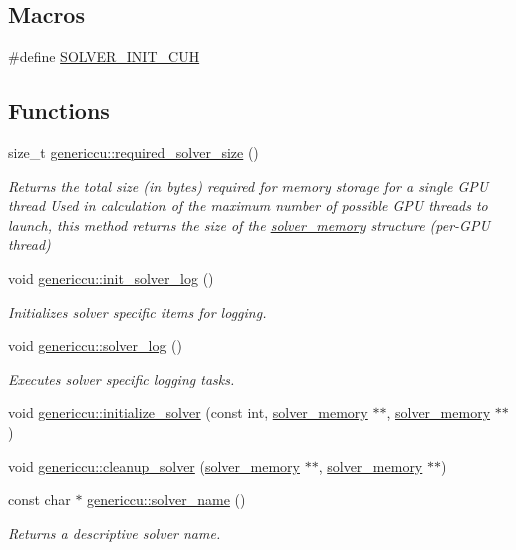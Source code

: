 \subsection*{Macros}
\begin{DoxyCompactItemize}
\item 
\#define \hyperlink{solver__init_8cuh_a6476a3e2130c9d369a9f7f65aaf5721e}{S\+O\+L\+V\+E\+R\+\_\+\+I\+N\+I\+T\+\_\+\+C\+UH}
\end{DoxyCompactItemize}
\subsection*{Functions}
\begin{DoxyCompactItemize}
\item 
size\+\_\+t \hyperlink{namespacegenericcu_a95e70ae54ccfc5eb00792846ca80ecde}{genericcu\+::required\+\_\+solver\+\_\+size} ()
\begin{DoxyCompactList}\small\item\em Returns the total size (in bytes) required for memory storage for a single G\+PU thread Used in calculation of the maximum number of possible G\+PU threads to launch, this method returns the size of the \hyperlink{structsolver__memory}{solver\+\_\+memory} structure (per-\/\+G\+PU thread) \end{DoxyCompactList}\item 
void \hyperlink{namespacegenericcu_a358f079f3935e43979b5f56c1571e337}{genericcu\+::init\+\_\+solver\+\_\+log} ()
\begin{DoxyCompactList}\small\item\em Initializes solver specific items for logging. \end{DoxyCompactList}\item 
void \hyperlink{namespacegenericcu_a5decadd4be249498055f5de06892563c}{genericcu\+::solver\+\_\+log} ()
\begin{DoxyCompactList}\small\item\em Executes solver specific logging tasks. \end{DoxyCompactList}\item 
void \hyperlink{namespacegenericcu_af3d7e7d6a3b751c0fb942b20bc1ab296}{genericcu\+::initialize\+\_\+solver} (const int, \hyperlink{structsolver__memory}{solver\+\_\+memory} $\ast$$\ast$, \hyperlink{structsolver__memory}{solver\+\_\+memory} $\ast$$\ast$)
\item 
void \hyperlink{namespacegenericcu_ab44369c2115282f0907eea035ff453ad}{genericcu\+::cleanup\+\_\+solver} (\hyperlink{structsolver__memory}{solver\+\_\+memory} $\ast$$\ast$, \hyperlink{structsolver__memory}{solver\+\_\+memory} $\ast$$\ast$)
\item 
const char $\ast$ \hyperlink{namespacegenericcu_a21cc3f48896c010b61e283a6f4c82409}{genericcu\+::solver\+\_\+name} ()
\begin{DoxyCompactList}\small\item\em Returns a descriptive solver name. \end{DoxyCompactList}\end{DoxyCompactItemize}


